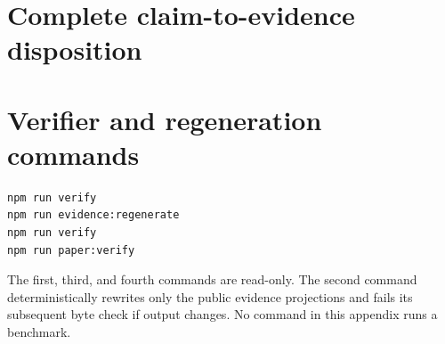 \documentclass[10pt]{article}
\begin{document}
\appendix
\section{Complete claim-to-evidence disposition}



\section{Verifier and regeneration commands}

\begin{verbatim}
npm run verify
npm run evidence:regenerate
npm run verify
npm run paper:verify
\end{verbatim}

The first, third, and fourth commands are read-only. The second command
deterministically rewrites only the public evidence projections and fails its
subsequent byte check if output changes. No command in this appendix runs a
benchmark.
\end{document}
